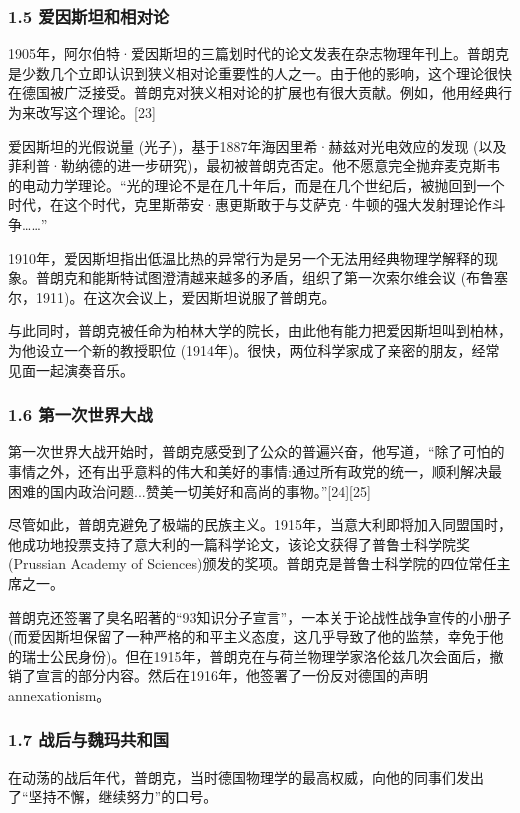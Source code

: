 \subsubsection{1.5 爱因斯坦和相对论}
1905年，阿尔伯特·爱因斯坦的三篇划时代的论文发表在杂志物理年刊上。普朗克是少数几个立即认识到狭义相对论重要性的人之一。由于他的影响，这个理论很快在德国被广泛接受。普朗克对狭义相对论的扩展也有很大贡献。例如，他用经典行为来改写这个理论。[23]

爱因斯坦的光假说量 (光子)，基于1887年海因里希·赫兹对光电效应的发现 (以及菲利普·勒纳德的进一步研究)，最初被普朗克否定。他不愿意完全抛弃麦克斯韦的电动力学理论。“光的理论不是在几十年后，而是在几个世纪后，被抛回到一个时代，在这个时代，克里斯蒂安·惠更斯敢于与艾萨克·牛顿的强大发射理论作斗争……”

1910年，爱因斯坦指出低温比热的异常行为是另一个无法用经典物理学解释的现象。普朗克和能斯特试图澄清越来越多的矛盾，组织了第一次索尔维会议 (布鲁塞尔，1911)。在这次会议上，爱因斯坦说服了普朗克。

与此同时，普朗克被任命为柏林大学的院长，由此他有能力把爱因斯坦叫到柏林，为他设立一个新的教授职位 (1914年)。很快，两位科学家成了亲密的朋友，经常见面一起演奏音乐。

\subsubsection{1.6 第一次世界大战}
第一次世界大战开始时，普朗克感受到了公众的普遍兴奋，他写道，“除了可怕的事情之外，还有出乎意料的伟大和美好的事情:通过所有政党的统一，顺利解决最困难的国内政治问题...赞美一切美好和高尚的事物。”[24][25]

尽管如此，普朗克避免了极端的民族主义。1915年，当意大利即将加入同盟国时，他成功地投票支持了意大利的一篇科学论文，该论文获得了普鲁士科学院奖(Prussian Academy of Sciences)颁发的奖项。普朗克是普鲁士科学院的四位常任主席之一。

普朗克还签署了臭名昭著的“93知识分子宣言”，一本关于论战性战争宣传的小册子 (而爱因斯坦保留了一种严格的和平主义态度，这几乎导致了他的监禁，幸免于他的瑞士公民身份)。但在1915年，普朗克在与荷兰物理学家洛伦兹几次会面后，撤销了宣言的部分内容。然后在1916年，他签署了一份反对德国的声明 annexationism。

\subsubsection{1.7 战后与魏玛共和国}
在动荡的战后年代，普朗克，当时德国物理学的最高权威，向他的同事们发出了“坚持不懈，继续努力”的口号。

